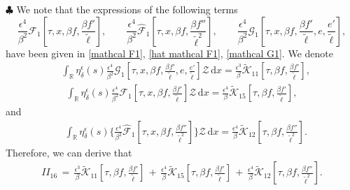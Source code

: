\documentclass[10pt, reqno]{amsart}
\numberwithin{equation}{section}
\theoremstyle{definition}
\begin{document}
{\smallskip\noindent$\clubsuit$
 We note that the expressions of the following terms
$$
 \frac{\epsilon^4}{\beta^2} \mathcal F_1\left[\tau, x, \beta f, \frac{\beta f'}{\tilde\ell} \right],
  \qquad
\frac{\epsilon^4}{\beta^2} \hat{\mathcal F}_1\left[\tau, x, \beta f, \frac{\beta f''}{\tilde\ell^2} \right],
 \qquad
 \frac{\epsilon^4} {\beta^2} \mathcal G_1\left[\tau, x, \beta f, \frac{\beta f'}{\tilde\ell}, e, \frac{e'}{\tilde\ell}\right],
$$
have been given in \eqref{mathcal F1}, \eqref{hat mathcal F1}, \eqref{mathcal G1}. We denote
\begin{align*}
& \int_{\mathbb R} \eta_\delta^\epsilon(s) \frac{\epsilon^4} {\beta^2} \mathcal G_1\left[\tau, x, \beta f, \frac{\beta f'}{\tilde\ell}, e, \frac{e'}{\tilde\ell}\right] \mathcal Z \,{\mathrm d}x
 = \frac{\epsilon^3}{\beta}\tilde{\mathcal K}_{11}\left[\tau, \beta f, \frac{\beta {f}'}{\tilde\ell}\right],
\end{align*}
\begin{align*}
 \int_{\mathbb R} \eta_\delta^\epsilon(s) \frac{\epsilon^4}{\beta^2} \mathcal F_1\left[\tau, x, \beta f, \frac{\beta f'}{\tilde\ell} \right] \mathcal Z \,{\mathrm d}x
 = \frac{\epsilon^4}{\beta}\tilde{\mathcal K}_{15}\left[\tau, \beta f, \frac{\beta {f}'}{\tilde\ell}\right],
\end{align*}
 and
\begin{align*}
 & \int_{\mathbb R} \eta_\delta^\epsilon(s) \Bigg\{ \frac{\epsilon^4}{\beta^2} \hat{\mathcal F}_1\left[\tau, x, \beta f, \frac{\beta f''}{\tilde\ell^2} \right] \Bigg\} \mathcal Z \,{\mathrm d}x
 = \frac{\epsilon^4}{\beta}\tilde{\mathcal K}_{12}\left[\tau, \beta f, \frac{\beta f''}{\tilde\ell^2}\right].
\end{align*}
Therefore, we can derive that
\begin{align}\label{ESTIMATEII16}
II_{16}\,=\,\frac{\epsilon^3}{\beta}\tilde{\mathcal K}_{11}\left[\tau, \beta f, \frac{\beta {f}'}{\tilde\ell}\right]\,+\, \frac{\epsilon^4}{\beta}\tilde{\mathcal K}_{15}\left[\tau, \beta f, \frac{\beta {f}'}{\tilde\ell}\right]
\,+\,\frac{\epsilon^4}{\beta}\tilde{\mathcal K}_{12}\left[\tau, \beta f, \frac{\beta f''}{\tilde\ell^2}\right].
\end{align}


}
\end{document}
